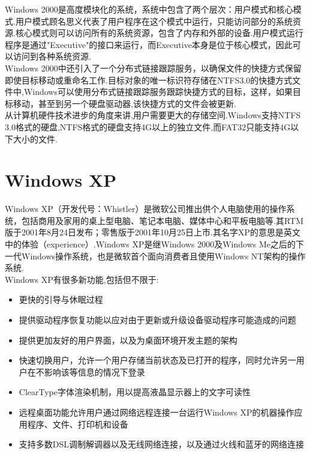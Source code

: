 \documentclass[a4paper,12pt,notitlepage]{article}
\begin{document}
	Windows 2000是高度模块化的系统，系统中包含了两个层次：用户模式和核心模式.用户模式顾名思义代表了用户程序在这个模式中运行，只能访问部分的系统资源.核心模式则可以访问所有的系统资源，包含了内存和外部的设备.用户模式运行程序是通过"Executive"的接口来运行，而Executive本身是位于核心模式，因此可以访问到各种系统资源. \\
	
	Windows 2000中还引入了一个分布式链接跟踪服务，以确保文件的快捷方式保留即使目标移动或重命名工作.目标对象的唯一标识符存储在NTFS3.0的快捷方式文件中,Windows可以使用分布式链接跟踪服务跟踪快捷方式的目标，这样，如果目标移动，甚至到另一个硬盘驱动器,该快捷方式的文件会被更新. \\
	
	从计算机硬件技术进步的角度来讲,用户需要更大的存储空间.Windows支持NTFS 3.0格式的硬盘,NTFS格式的硬盘支持4G以上的独立文件,而FAT32只能支持4G以下大小的文件. \\
	
\section{Windows XP}

	Windows XP（开发代号：Whistler）是微软公司推出供个人电脑使用的操作系统，包括商用及家用的桌上型电脑、笔记本电脑、媒体中心和平板电脑等.其RTM版于2001年8月24日发布；零售版于2001年10月25日上市.其名字XP的意思是英文中的体验（experience）.Windows XP是继Windows 2000及Windows Me之后的下一代Windows操作系统，也是微软首个面向消费者且使用Windows NT架构的操作系统. \\
	
	Windows XP有很多新功能,包括但不限于:
	
\begin{itemize}
	\item 更快的引导与休眠过程
	\item 提供驱动程序恢复功能以应对由于更新或升级设备驱动程序可能造成的问题
	\item 提供更加友好的用户界面，以及为桌面环境开发主题的架构
	\item 快速切换用户，允许一个用户存储当前状态及已打开的程序，同时允许另一用户在不影响该等信息的情况下登录
	\item ClearType字体渲染机制，用以提高液晶显示器上的文字可读性
	\item 远程桌面功能允许用户通过网络远程连接一台运行Windows XP的机器操作应用程序、文件、打印机和设备
	\item 支持多数DSL调制解调器以及无线网络连接，以及通过火线和蓝牙的网络连接
\end{itemize}
\end{document}
